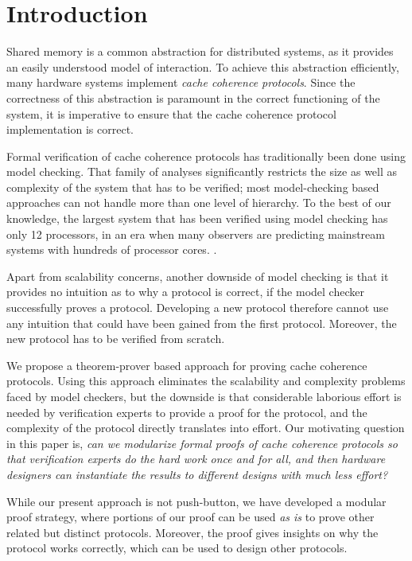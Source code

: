\section{Introduction}
\label{sec:Introduction}

Shared memory is a common abstraction for distributed systems, as it provides
an easily understood model of interaction. To achieve this abstraction
efficiently, many hardware systems implement \emph{cache coherence protocols}.
Since the correctness of this abstraction is paramount in the correct
functioning of the system, it is imperative to ensure that the cache coherence
protocol implementation is correct.

Formal verification of cache coherence protocols has traditionally been done
using model checking. That family of analyses significantly restricts the size as
well as complexity of the system that has to be verified; most model-checking
based approaches can not handle more than one level of hierarchy. To the best
of our knowledge, the largest system that has been verified using
model checking has only 12 processors, in an era when many observers are
predicting mainstream systems with hundreds of processor cores.
.

Apart from scalability concerns, another downside of model checking
is that it provides no intuition as to why a protocol is correct, if
the model checker successfully proves a protocol. Developing a new protocol
therefore cannot use any intuition that could have been gained from
the first protocol. Moreover, the new protocol has to be verified from scratch.

We propose a theorem-prover based approach for proving cache coherence
protocols. Using this approach eliminates the scalability and complexity
problems faced by model checkers, but the downside is that considerable
laborious effort is needed by verification experts to provide a proof for the
protocol, and the complexity of the protocol directly translates into effort.
Our motivating question in this paper is,
\emph{can we modularize formal proofs of cache coherence protocols so that
verification experts do the hard work once and for all, and then hardware
designers can instantiate the results to different designs with much less
effort?}

While our present approach is not push-button, we have developed a
modular proof strategy, where portions of our proof can be used \emph{as is} to
prove other related but distinct protocols. Moreover, the proof gives
insights on why the protocol works correctly, which can be used to design other
protocols.

